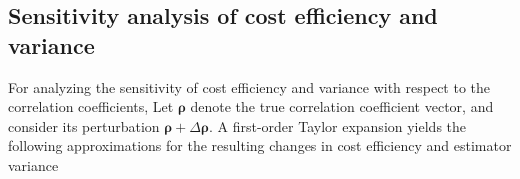 \subsection{Sensitivity analysis of cost efficiency and variance}
For analyzing the sensitivity of cost efficiency and variance with respect to the correlation coefficients, Let $\boldsymbol{\rho}$ denote the true correlation coefficient vector, and consider its perturbation $\boldsymbol{\rho}+\Delta \boldsymbol{\rho}$. A first-order Taylor expansion yields the following approximations for the resulting changes in cost efficiency and estimator variance
%



